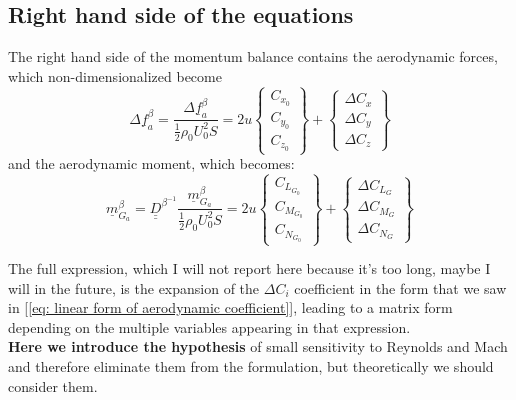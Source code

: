 \subsection{Right hand side of the equations}
The right hand side of the momentum balance contains the aerodynamic forces, which non-dimensionalized become
\begin{equation}
    \Delta \underline{f}_a^\beta = \frac{\Delta \underline{f}_a^\beta}{\frac{1}{2}\rho_0U_0^2S}=2u \begin{Bmatrix}
        C_{x_0}\\
        C_{y_0}\\
        C_{z_0}
    \end{Bmatrix} +
    \begin{Bmatrix}
        \Delta C_x\\
        \Delta C_y\\
        \Delta C_z
    \end{Bmatrix}
\end{equation}
and the aerodynamic moment, which becomes:
\begin{equation}
    \underline{m}_{G_a}^\beta = \underline{\underline{D}}^{\beta^{-1}} \frac{\underline{m}_{G_a}^\beta}{\frac{1}{2}\rho_0U_0^2S} = 2u \begin{Bmatrix}
        C_{L_{G_0}}\\
        C_{M_{G_0}}\\
        C_{N_{G_0}}
    \end{Bmatrix}+
    \begin{Bmatrix}
       \Delta C_{L_{G}}\\
       \Delta C_{M_{G}}\\
       \Delta C_{N_{G}}
    \end{Bmatrix}
\end{equation}

The full expression, which I will not report here because it's too long, maybe I will in the future, is the expansion of the $\Delta C_i$ coefficient in the form that we saw in [\ref{eq: linear form of aerodynamic coefficient}], leading to a matrix form depending on the multiple variables appearing in that expression.
\\
\textbf{Here we introduce the hypothesis} of small sensitivity to Reynolds and Mach and therefore eliminate them from the formulation, but theoretically we should consider them.
\\


